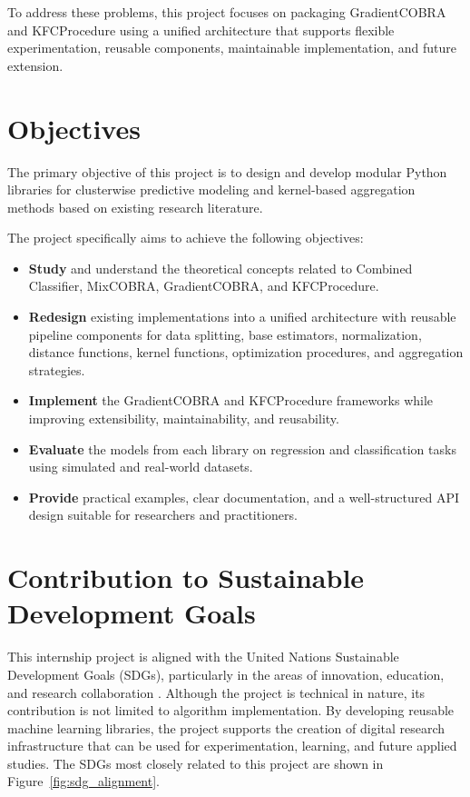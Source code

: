 To address these problems, this project focuses on packaging GradientCOBRA and KFCProcedure using a unified architecture that supports flexible experimentation, reusable components, maintainable implementation, and future extension.

\section{Objectives}

\hs The primary objective of this project is to design and develop modular Python libraries for clusterwise predictive modeling and kernel-based aggregation methods based on existing research literature.

The project specifically aims to achieve the following objectives:

\begin{itemize}        
    \item \textbf{Study} and understand the theoretical concepts related to Combined Classifier, MixCOBRA, GradientCOBRA, and KFCProcedure.
    \item \textbf{Redesign} existing implementations into a unified architecture with reusable pipeline components for data splitting, base estimators, normalization, distance functions, kernel functions, optimization procedures, and aggregation strategies.
    \item \textbf{Implement} the GradientCOBRA and KFCProcedure frameworks while improving extensibility, maintainability, and reusability.
    \item \textbf{Evaluate} the models from each library on regression and classification tasks using simulated and real-world datasets.
    \item \textbf{Provide} practical examples, clear documentation, and a well-structured API design suitable for researchers and practitioners.
\end{itemize}

\section{Contribution to Sustainable Development Goals}

\hs This internship project is aligned with the United Nations Sustainable Development Goals (SDGs), particularly in the areas of innovation, education, and research collaboration \cite{un2015sdgs}. Although the project is technical in nature, its contribution is not limited to algorithm implementation. By developing reusable machine learning libraries, the project supports the creation of digital research infrastructure that can be used for experimentation, learning, and future applied studies. The SDGs most closely related to this project are shown in Figure~\ref{fig:sdg_alignment}.

